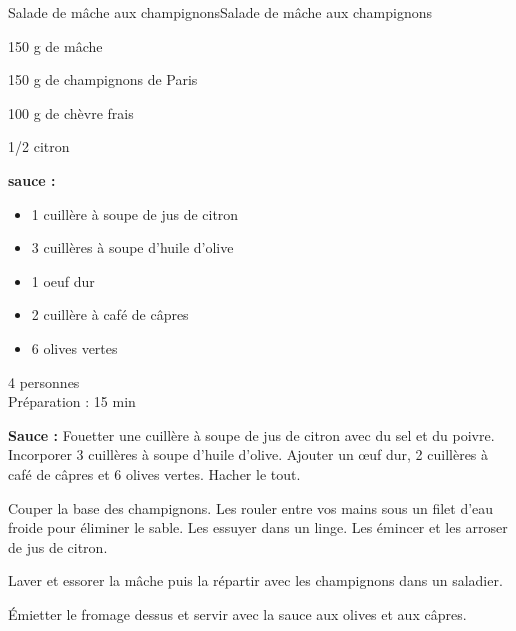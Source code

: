 \begin{recette}{Salade de mâche aux champignons}{Salade de mâche aux champignons}

\begin{ingredients}
 150 g de mâche \par
 150 g de champignons de Paris \par
 100 g de chèvre frais \par
 1/2 citron \par
\textbf{ sauce :}
\begin{itemize}
\item[] 1 cuillère à soupe de jus de citron
\item[] 3 cuillères à soupe d'huile d'olive
\item[] 1 oeuf dur
\item[] 2 cuillère à café de câpres
\item[] 6 olives vertes
\end{itemize}
\end{ingredients}
\begin{infos}
	4 personnes	\\	%
Préparation : 15 min		%
\end{infos}
\begin{etapes}
\item \textbf{Sauce :} Fouetter une cuillère à soupe de jus de citron avec du sel et du poivre. Incorporer 3 cuillères à soupe d'huile d'olive. Ajouter un œuf dur, 2 cuillères à café de câpres et 6 olives vertes. Hacher le tout.
\item Couper la base des champignons. Les rouler entre vos mains sous un filet d'eau froide pour éliminer le sable. Les essuyer dans un linge. Les émincer et les arroser de jus de citron.
\item Laver et essorer la mâche puis la répartir avec les champignons dans un saladier.
\item Émietter le fromage dessus et servir avec la sauce aux olives et aux câpres.
\end{etapes}

\end{recette}